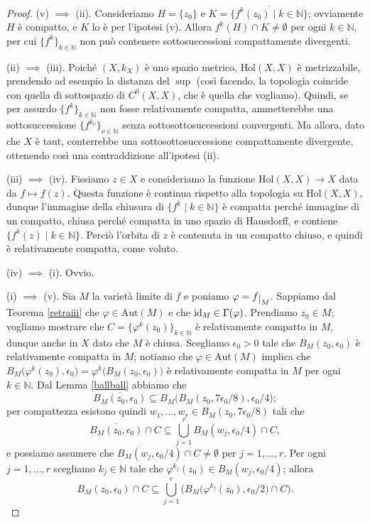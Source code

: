 \begin{proof}
    (v) $\implies$ (ii). Consideriamo $H=\{z_0\}$ e $K=\overline{\{f^k(z_0)\mid k\in\mathbb{N}\}}$; ovviamente $H$ è compatto, e $K$ lo è per l'ipotesi (v). Allora $f^k(H)\cap K\not=\emptyset$ per ogni $k\in\mathbb{N}$, per cui $\{f^k\}_{k \in \mathbb{N}}$ non può contenere sottosuccessioni compattamente divergenti.

    (ii) $\implies$ (iii). Poiché $(X,k_X)$ è uno spazio metrico, $\text{Hol}(X,X)$ è metrizzabile, prendendo ad esempio la distanza del $\sup$ (così facendo, la topologia coincide con quella di sottospazio di $C^0(X,X)$, che è quella che vogliamo). Quindi, se per assurdo $\{f^k\}_{k \in \mathbb{N}}$ non fosse relativamente compatta, ammetterebbe una sottosuccessione $\{f^{k_\nu}\}_{\nu\in\mathbb{N}}$ senza sottosottosuccessioni convergenti. Ma allora, dato che $X$ è taut, conterrebbe una sottosottosuccessione compattamente divergente, ottenendo così una contraddizione all'ipotesi (ii).

    (iii) $\implies$ (iv). Fissiamo $z\in X$ e consideriamo la funzione $\text{Hol}(X,X)\longrightarrow X$ data da $f\longmapsto f(z)$. Questa funzione è continua rispetto alla topologia su $\text{Hol}(X,X)$, dunque l'immagine della chiusura di $\{f^k\mid k\in\mathbb{N}\}$ è compatta perché immagine di un compatto, chiusa perché compatta in uno spazio di Hausdorff, e contiene $\{f^k(z)\mid k\in\mathbb{N}\}$. Perciò l'orbita di $z$ è contenuta in un compatto chiuso, e quindi è relativamente compatta, come voluto.

    (iv) $\implies$ (i). Ovvio.

    (i) $\implies$ (v). Sia $M$ la varietà limite di $f$ e poniamo $\varphi=f\restrict{M}$. Sappiamo dal Teorema \ref{retraiii} che $\varphi\in\text{Aut}(M)$ e che $\operatorname{id}_M\in\Gamma(\varphi)$. Prendiamo $z_0 \in M$; vogliamo mostrare che $C=\{\varphi^k(z_0)\}_{k\in\mathbb{N}}$ è relativamente compatto in $M$, dunque anche in $X$ dato che $M$ è chiusa. Scegliamo $\epsilon_0>0$ tale che $B_M(z_0,\epsilon_0)$ è relativamente compatta in $M$; notiamo che $\varphi\in\text{Aut}(M)$ implica che $B_M\big(\varphi^k(z_0),\epsilon_0\big)=\varphi^k\big(B_M(z_0,\epsilon_0)\big)$ è relativamente compatta in $M$ per ogni $k \in \mathbb{N}$. Dal Lemma \ref{ballball} abbiamo che
    $$\overline{B_M(z_0,\epsilon_0)} \subseteq B_M\big(B_M(z_0,7\epsilon_0/8),\epsilon_0/4\big);$$
    per compattezza esistono quindi $w_1,\dots,w_r \in B_M(z_0,7\epsilon_0/8)$ tali che
    $$\overline{B_M(z_0,\epsilon_0)}\cap C\subseteq \bigcup_{j=1}^r B_M(w_j,\epsilon_0/4)\cap C,$$
    e possiamo assumere che $B_M(w_j,\epsilon_0/4)\cap C\not=\emptyset$ per $j=1,\dots,r$.
    Per ogni $j=1,\dots, r$ scegliamo $k_j\in\mathbb{N}$ tale che $\varphi^{k_j}(z_0)\in B_M(w_j,\epsilon_0/4)$; allora
    \begin{equation}\label{capci}
        B_M(z_0,\epsilon_0)\cap C \subseteq \bigcup_{j=1}^r \Big(B_M\big(\varphi^{k_j}(z_0),\epsilon_0/2\big)\cap C\Big).
    \end{equation}


\end{proof}
